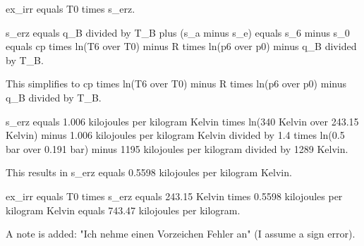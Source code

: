 ex_irr equals T0 times s_erz.  

s_erz equals q_B divided by T_B plus (s_a minus s_e) equals s_6 minus s_0 equals cp times ln(T6 over T0) minus R times ln(p6 over p0) minus q_B divided by T_B.  

This simplifies to cp times ln(T6 over T0) minus R times ln(p6 over p0) minus q_B divided by T_B.  

s_erz equals 1.006 kilojoules per kilogram Kelvin times ln(340 Kelvin over 243.15 Kelvin) minus 1.006 kilojoules per kilogram Kelvin divided by 1.4 times ln(0.5 bar over 0.191 bar) minus 1195 kilojoules per kilogram divided by 1289 Kelvin.  

This results in s_erz equals 0.5598 kilojoules per kilogram Kelvin.  

ex_irr equals T0 times s_erz equals 243.15 Kelvin times 0.5598 kilojoules per kilogram Kelvin equals 743.47 kilojoules per kilogram.  

A note is added: "Ich nehme einen Vorzeichen Fehler an" (I assume a sign error).